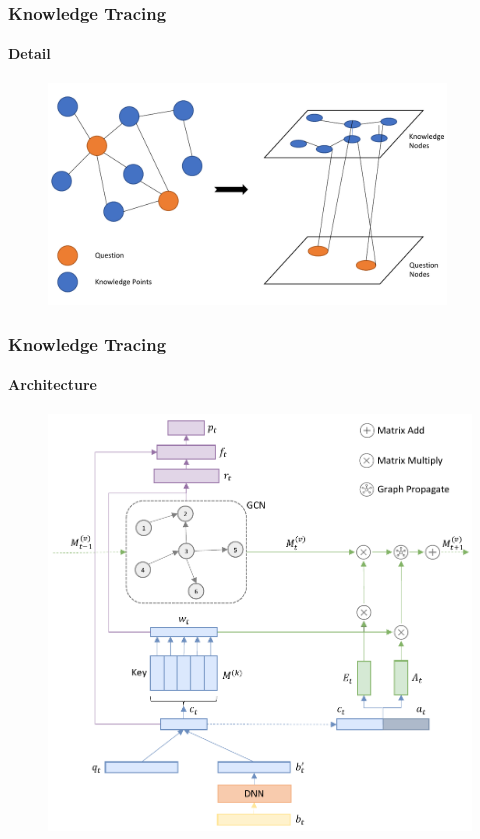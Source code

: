 \documentclass{beamer}
\begin{document}
\begin{frame}
  \frametitle{Knowledge Tracing}
  \framesubtitle{Detail}
  \begin{figure}
    \includegraphics[width=0.94\textwidth]{figures/ch3-gat-kq.pdf}

  \end{figure}
\end{frame}

\begin{frame}
  \frametitle{Knowledge Tracing}
  \framesubtitle{Architecture}
  \begin{figure}
    \includegraphics[height=0.8\textheight]{figures/ch3-ov.pdf}
  \end{figure}
\end{frame}
\end{document}
